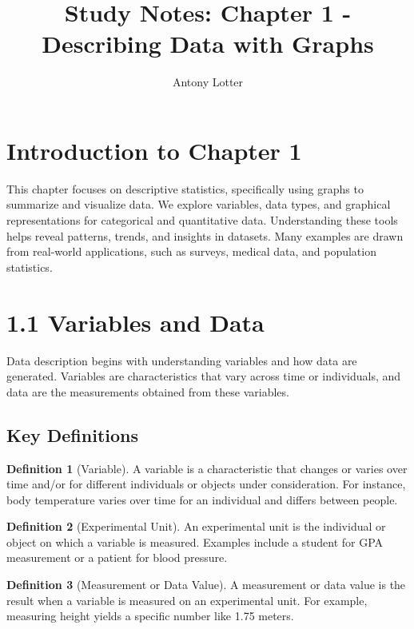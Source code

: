 \documentclass{article}
\title{Study Notes: Chapter 1 - Describing Data with Graphs}
\author{Antony Lotter}
\date{}
\theoremstyle{definition}
\newtheorem{definition}{Definition}
\begin{document}
	
	\maketitle
	
	\section{Introduction to Chapter 1}
	This chapter focuses on descriptive statistics, specifically using graphs to summarize and visualize data. We explore variables, data types, and graphical representations for categorical and quantitative data. Understanding these tools helps reveal patterns, trends, and insights in datasets. Many examples are drawn from real-world applications, such as surveys, medical data, and population statistics.
	
	\section{1.1 Variables and Data}
	Data description begins with understanding variables and how data are generated. Variables are characteristics that vary across time or individuals, and data are the measurements obtained from these variables.
	
	\subsection{Key Definitions}
	
	\begin{definition}[Variable]
		A variable is a characteristic that changes or varies over time and/or for different individuals or objects under consideration. For instance, body temperature varies over time for an individual and differs between people.
	\end{definition}
	
	\begin{definition}[Experimental Unit]
		An experimental unit is the individual or object on which a variable is measured. Examples include a student for GPA measurement or a patient for blood pressure.
	\end{definition}
	
	\begin{definition}[Measurement or Data Value]
		A measurement or data value is the result when a variable is measured on an experimental unit. For example, measuring height yields a specific number like 1.75 meters.
	\end{definition}
	
\end{document}
